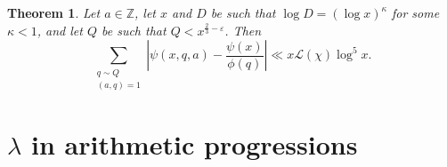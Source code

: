 \documentclass{amsart}
\newtheorem{theorem}{Theorem}[section]
\newtheorem{lemma}[theorem]{Lemma}
\begin{document}
\begin{theorem}\label{Main2}
Let $a\in \mathbb Z$, let $x$ and $D$ be such that $\log D=(\log x)^{\kappa}$ for some $\kappa<1$, and let $Q$ be such that $Q<x^{\frac 23-\varepsilon}$.  Then
$$\sum_{\substack{q\sim Q \\ (a,q)=1}}\left|\psi(x,q,a)-\frac{\psi(x)}{\phi(q)}\right|\ll x\mathcal L(\chi)\log^5 x.$$
\end{theorem}




\section{$\lambda$ in arithmetic progressions}\label{Deflambda}


\end{document}

